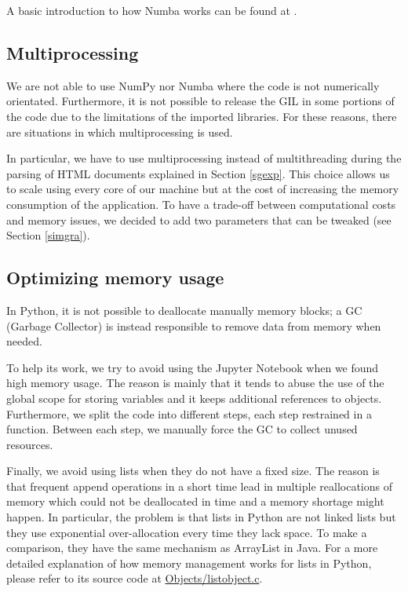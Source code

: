 A basic introduction to how Numba works can be found at \cite{10.1145/2833157.2833162}.

\subsection{Multiprocessing}
We are not able to use NumPy nor Numba where the code is not numerically orientated.
Furthermore, it is not possible to release the GIL in some portions of the code
due to the limitations of the imported libraries.
For these reasons, there are situations in which multiprocessing is used.

In particular, we have to use multiprocessing instead of multithreading during the parsing of
HTML documents explained in Section \ref{sgexp}.
This choice allows us to scale using every core of our machine
but at the cost of increasing the memory consumption of the application.
To have a trade-off between computational costs
and memory issues, we decided to add two parameters that can be tweaked (see Section \ref{simgra}).

\subsection{Optimizing memory usage}
In Python, it is not possible to deallocate manually memory blocks; a GC (Garbage Collector)
is instead responsible to remove data from memory when needed.

To help its work, we try to avoid using the Jupyter Notebook when we found high memory usage.
The reason is mainly that it tends to abuse the use of the global scope for storing variables
and it keeps additional references to objects. Furthermore, we split the code into different steps,
each step restrained in a function.
Between each step, we manually force the GC to collect unused resources.

Finally, we avoid using lists when they do not have a fixed size.
The reason is that frequent append operations in a short time lead in multiple reallocations of
memory which could not be deallocated in time and a memory shortage might happen.
In particular, the problem is that lists in Python are not linked lists but they use
exponential over-allocation every time they lack space. To make a comparison, they have the same
mechanism as ArrayList in Java.
For a more detailed explanation of how memory management works for lists in Python, please refer to
its source code at
\href{https://github.com/python/cpython/blob/3.7/Objects/listobject.c}{Objects/listobject.c}.